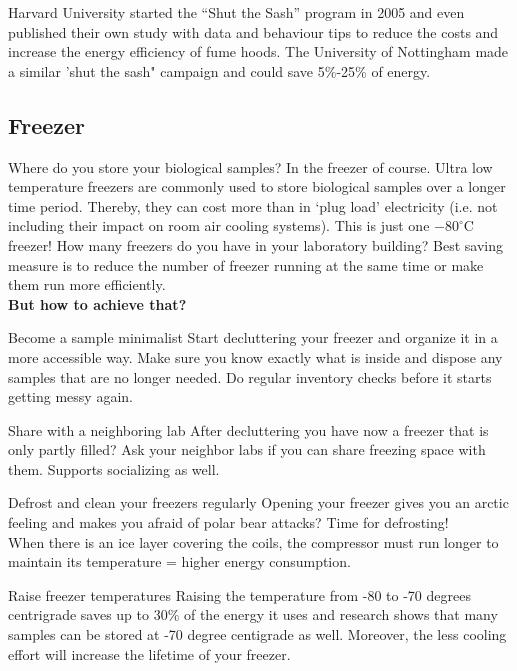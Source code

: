 Harvard University started the “Shut the Sash” program in 2005 and even published their own study with data and behaviour tips to reduce the costs and increase the energy efficiency of fume hoods.\cite{Harvard_sash}
The University of Nottingham made a similar 'shut the sash" campaign and could save 5\%-25\% of energy.
\cite{Nottingham_sash}


\subsection{Freezer}
Where do you store your biological samples? In the freezer of course. 
Ultra low temperature freezers are commonly used to store biological samples over a longer time period. Thereby, they can cost more than  in ‘plug load’ electricity (i.e. not including their impact on room air cooling systems). This is just one $-80^\circ \text{C}$ freezer!
How many freezers do you have in your laboratory building? 
Best saving measure is to reduce the number of freezer running at the same time or make them run more efficiently. \\

\textbf{But how to achieve that?  }

\begin{suggest}{Become a sample minimalist}
		Start decluttering your freezer and organize it in a more accessible way. Make sure you know exactly what is inside and dispose any samples that are no longer needed. Do regular inventory checks before it starts getting messy again. 
\end{suggest}

\begin{suggest}{Share with a neighboring lab}
	After decluttering you have now a freezer that is only partly filled? Ask your neighbor labs if you can share freezing space with them. Supports socializing as well.
\end{suggest}

\begin{suggest}{Defrost and clean your freezers regularly}
	Opening your freezer gives you an arctic feeling and makes you afraid of polar bear attacks? Time for defrosting!\\ 
	When there is an ice layer covering the coils, the compressor must run longer to maintain its temperature = higher energy consumption.
\end{suggest}

\begin{suggest}{Raise freezer temperatures}
	Raising the temperature from -80 to -70 degrees centrigrade saves up to 30\% of the energy it uses and research shows that many samples can be stored at -70 degree centigrade as well. Moreover, the less cooling effort will increase the lifetime of your freezer. 
\end{suggest}

